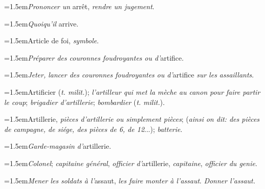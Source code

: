 \par{\dictfontsize\hangindent=1.5em\noindent \textit{Prononcer un} arrêt, \textit{rendre un jugement}. \par}
\par{\dictfontsize\hangindent=1.5em\noindent \textit{Quoiqu’il} arrive. \par}
\par{\dictfontsize\hangindent=1.5em\noindent Article de foi, \textit{symbole}. \par}
\par{\dictfontsize\hangindent=1.5em\noindent \textit{Préparer des couronnes foudroyantes ou d’}artifice. \par}
\par{\dictfontsize\hangindent=1.5em\noindent \textit{Jeter, lancer des couronnes foudroyantes ou d’}artifice \textit{sur les assaillants}. \par}
\par{\dictfontsize\hangindent=1.5em\noindent Artificier (\textit{t. milit.}); \textit{l’artilleur qui met la mèche au canon pour faire partir le coup}; \textit{brigadier d’artillerie}; \textit{bombardier} (\textit{t. milit.}). \par}
\par{\dictfontsize\hangindent=1.5em\noindent Artillerie, \textit{pièces d’artillerie ou simplement pièces}; (\textit{ainsi on dit: des pièces de campagne, de siége, des pièces de 6, de 12}...); \textit{batterie}. \par}
\par{\dictfontsize\hangindent=1.5em\noindent \textit{Garde-magasin d’}artillerie. \par}
\par{\dictfontsize\hangindent=1.5em\noindent \textit{Colonel}; \textit{capitaine général}, \textit{officier d’}artillerie, \textit{capitaine}, \textit{officier du genie}. \par}
\par{\dictfontsize\hangindent=1.5em\noindent \textit{Mener les soldats à l’}assaut, \textit{les faire monter à l’assaut}. \textit{Donner l’assaut.} \par}
